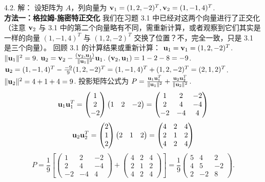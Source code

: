 \begin{exer}
4.2. 解：
设矩阵为 $A$，列向量为 $\mathbf{v}_1 = (1, 2, -2)^T, \mathbf{v}_2 = (1, -1, 4)^T$.
\\
\textbf{方法一：格拉姆-施密特正交化}
我们在习题 3.1 中已经对这两个向量进行了正交化（注意 $\mathbf{v}_2$ 与 3.1 中的第二个向量略有不同，需重新计算，或者观察到它们其实是一样的向量 $(1, -1, 4)^T$ 与 $(1, 2, -2)^T$ 交换了位置？不，完全一致，只是 3.1 是三个向量）。
回顾 3.1 的计算结果或重新计算：
$\mathbf{u}_1 = \mathbf{v}_1 = (1, 2, -2)^T$. $\|\mathbf{u}_1\|^2 = 9$.
$\mathbf{u}_2 = \mathbf{v}_2 - \frac{(\mathbf{v}_2, \mathbf{u}_1)}{\|\mathbf{u}_1\|^2}\mathbf{u}_1$.
$(\mathbf{v}_2, \mathbf{u}_1) = 1 - 2 - 8 = -9$.
$\mathbf{u}_2 = (1, -1, 4)^T - \frac{-9}{9}(1, 2, -2)^T = (1, -1, 4)^T + (1, 2, -2)^T = (2, 1, 2)^T$.
$\|\mathbf{u}_2\|^2 = 4+1+4=9$.
投影矩阵公式为 $P = \frac{\mathbf{u}_1\mathbf{u}_1^T}{\|\mathbf{u}_1\|^2} + \frac{\mathbf{u}_2\mathbf{u}_2^T}{\|\mathbf{u}_2\|^2}$.
$$ \mathbf{u}_1\mathbf{u}_1^T = \begin{pmatrix} 1 \\ 2 \\ -2 \end{pmatrix} \begin{pmatrix} 1 & 2 & -2 \end{pmatrix} = \begin{pmatrix} 1 & 2 & -2 \\ 2 & 4 & -4 \\ -2 & -4 & 4 \end{pmatrix} $$
$$ \mathbf{u}_2\mathbf{u}_2^T = \begin{pmatrix} 2 \\ 1 \\ 2 \end{pmatrix} \begin{pmatrix} 2 & 1 & 2 \end{pmatrix} = \begin{pmatrix} 4 & 2 & 4 \\ 2 & 1 & 2 \\ 4 & 2 & 4 \end{pmatrix} $$
$$ P = \frac{1}{9} \left[ \begin{pmatrix} 1 & 2 & -2 \\ 2 & 4 & -4 \\ -2 & -4 & 4 \end{pmatrix} + \begin{pmatrix} 4 & 2 & 4 \\ 2 & 1 & 2 \\ 4 & 2 & 4 \end{pmatrix} \right] = \frac{1}{9} \begin{pmatrix} 5 & 4 & 2 \\ 4 & 5 & -2 \\ 2 & -2 & 8 \end{pmatrix}. $$

\end{exer}
